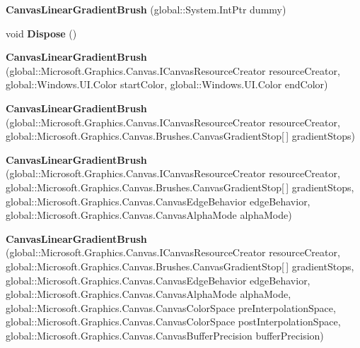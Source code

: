 \begin{DoxyCompactItemize}
{\bfseries Canvas\+Linear\+Gradient\+Brush} (global\+::\+System.\+Int\+Ptr dummy)
\item 
\mbox{\label{class_microsoft_1_1_graphics_1_1_canvas_1_1_brushes_1_1_canvas_linear_gradient_brush_af7428e4f8e3d528affde23a40ae75b52}} 
void {\bfseries Dispose} ()
\item 
\mbox{\label{class_microsoft_1_1_graphics_1_1_canvas_1_1_brushes_1_1_canvas_linear_gradient_brush_a4b33cfab37ecd3d6b6bef46dae48c88c}} 
{\bfseries Canvas\+Linear\+Gradient\+Brush} (global\+::\+Microsoft.\+Graphics.\+Canvas.\+I\+Canvas\+Resource\+Creator resource\+Creator, global\+::\+Windows.\+U\+I.\+Color start\+Color, global\+::\+Windows.\+U\+I.\+Color end\+Color)
\item 
\mbox{\label{class_microsoft_1_1_graphics_1_1_canvas_1_1_brushes_1_1_canvas_linear_gradient_brush_a60887ec32c82a971148a38aea74b62ea}} 
{\bfseries Canvas\+Linear\+Gradient\+Brush} (global\+::\+Microsoft.\+Graphics.\+Canvas.\+I\+Canvas\+Resource\+Creator resource\+Creator, global\+::\+Microsoft.\+Graphics.\+Canvas.\+Brushes.\+Canvas\+Gradient\+Stop\mbox{[}$\,$\mbox{]} gradient\+Stops)
\item 
\mbox{\label{class_microsoft_1_1_graphics_1_1_canvas_1_1_brushes_1_1_canvas_linear_gradient_brush_a84d29f89ab093f50d09215ddab09cbf1}} 
{\bfseries Canvas\+Linear\+Gradient\+Brush} (global\+::\+Microsoft.\+Graphics.\+Canvas.\+I\+Canvas\+Resource\+Creator resource\+Creator, global\+::\+Microsoft.\+Graphics.\+Canvas.\+Brushes.\+Canvas\+Gradient\+Stop\mbox{[}$\,$\mbox{]} gradient\+Stops, global\+::\+Microsoft.\+Graphics.\+Canvas.\+Canvas\+Edge\+Behavior edge\+Behavior, global\+::\+Microsoft.\+Graphics.\+Canvas.\+Canvas\+Alpha\+Mode alpha\+Mode)
\item 
\mbox{\label{class_microsoft_1_1_graphics_1_1_canvas_1_1_brushes_1_1_canvas_linear_gradient_brush_a5fbbd2cc60fa7f11f4ce627c5a243729}} 
{\bfseries Canvas\+Linear\+Gradient\+Brush} (global\+::\+Microsoft.\+Graphics.\+Canvas.\+I\+Canvas\+Resource\+Creator resource\+Creator, global\+::\+Microsoft.\+Graphics.\+Canvas.\+Brushes.\+Canvas\+Gradient\+Stop\mbox{[}$\,$\mbox{]} gradient\+Stops, global\+::\+Microsoft.\+Graphics.\+Canvas.\+Canvas\+Edge\+Behavior edge\+Behavior, global\+::\+Microsoft.\+Graphics.\+Canvas.\+Canvas\+Alpha\+Mode alpha\+Mode, global\+::\+Microsoft.\+Graphics.\+Canvas.\+Canvas\+Color\+Space pre\+Interpolation\+Space, global\+::\+Microsoft.\+Graphics.\+Canvas.\+Canvas\+Color\+Space post\+Interpolation\+Space, global\+::\+Microsoft.\+Graphics.\+Canvas.\+Canvas\+Buffer\+Precision buffer\+Precision)

\end{DoxyCompactItemize}
